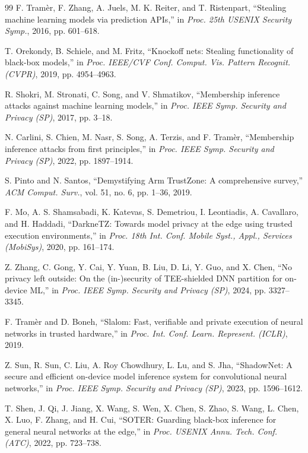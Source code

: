 \documentclass[lettersize,journal]{IEEEtran}
\begin{document}
\begin{thebibliography}{99}
F. Tram\`{e}r, F. Zhang, A. Juels, M. K. Reiter, and T. Ristenpart, ``Stealing machine learning models via prediction APIs,'' in \emph{Proc. 25th USENIX Security Symp.}, 2016, pp. 601--618.

T. Orekondy, B. Schiele, and M. Fritz, ``Knockoff nets: Stealing functionality of black-box models,'' in \emph{Proc. IEEE/CVF Conf. Comput. Vis. Pattern Recognit. (CVPR)}, 2019, pp. 4954--4963.

R. Shokri, M. Stronati, C. Song, and V. Shmatikov, ``Membership inference attacks against machine learning models,'' in \emph{Proc. IEEE Symp. Security and Privacy (SP)}, 2017, pp. 3--18.

N. Carlini, S. Chien, M. Nasr, S. Song, A. Terzis, and F. Tram\`{e}r, ``Membership inference attacks from first principles,'' in \emph{Proc. IEEE Symp. Security and Privacy (SP)}, 2022, pp. 1897--1914.

S. Pinto and N. Santos, ``Demystifying Arm TrustZone: A comprehensive survey,'' \emph{ACM Comput. Surv.}, vol. 51, no. 6, pp. 1--36, 2019.

F. Mo, A. S. Shamsabadi, K. Katevas, S. Demetriou, I. Leontiadis, A. Cavallaro, and H. Haddadi, ``DarkneTZ: Towards model privacy at the edge using trusted execution environments,'' in \emph{Proc. 18th Int. Conf. Mobile Syst., Appl., Services (MobiSys)}, 2020, pp. 161--174.

Z. Zhang, C. Gong, Y. Cai, Y. Yuan, B. Liu, D. Li, Y. Guo, and X. Chen, ``No privacy left outside: On the (in-)security of TEE-shielded DNN partition for on-device ML,'' in \emph{Proc. IEEE Symp. Security and Privacy (SP)}, 2024, pp. 3327--3345.

F. Tram\`{e}r and D. Boneh, ``Slalom: Fast, verifiable and private execution of neural networks in trusted hardware,'' in \emph{Proc. Int. Conf. Learn. Represent. (ICLR)}, 2019.

Z. Sun, R. Sun, C. Liu, A. Roy Chowdhury, L. Lu, and S. Jha, ``ShadowNet: A secure and efficient on-device model inference system for convolutional neural networks,'' in \emph{Proc. IEEE Symp. Security and Privacy (SP)}, 2023, pp. 1596--1612.

T. Shen, J. Qi, J. Jiang, X. Wang, S. Wen, X. Chen, S. Zhao, S. Wang, L. Chen, X. Luo, F. Zhang, and H. Cui, ``SOTER: Guarding black-box inference for general neural networks at the edge,'' in \emph{Proc. USENIX Annu. Tech. Conf. (ATC)}, 2022, pp. 723--738.


\end{thebibliography}
\end{document}
